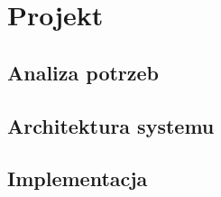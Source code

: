 \chapter{Projekt}

\lipsum[2]

\section{Analiza potrzeb}

\lipsum[5]

\section{Architektura systemu}

\lipsum[5]

\section{Implementacja}

